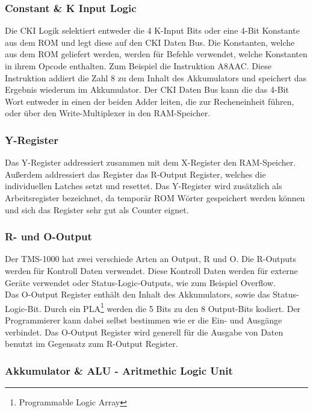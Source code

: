 \subsubsection{Constant \& K Input Logic}

Die CKI Logik selektiert entweder die 4 K-Input Bits oder eine 4-Bit Konstante aus dem ROM und legt diese auf den CKI Daten Bus. Die Konstanten, welche aus dem ROM geliefert werden, werden f{\"u}r Befehle verwendet, welche Konstanten in ihrem Opcode enthalten. Zum Beispiel die Instruktion A8AAC. Diese Instruktion addiert die Zahl 8 zu dem Inhalt des Akkumulators und speichert das Ergebnis wiederum im Akkumulator. Der CKI Daten Bus kann die das 4-Bit Wort entweder in einen der beiden Adder leiten, die zur Recheneinheit f{\"u}hren, oder {\"u}ber den Write-Multiplexer in den RAM-Speicher.

\subsubsection{Y-Register}

Das Y-Register addressiert zusammen mit dem X-Register den RAM-Speicher. Au{\ss}erdem addressiert das Register das R-Output Register, welches die individuellen Latches setzt und resettet. Das Y-Register wird zus{\"a}tzlich als Arbeitsregister bezeichnet, da tempor{\"a}r ROM W{\"o}rter gespeichert werden k{\"o}nnen und sich das Register sehr gut als Counter eignet.

\subsubsection{R- und O-Output}

Der TMS-1000 hat zwei verschiede Arten an Output, R und O. Die R-Outputs werden f{\"u}r Kontroll Daten verwendet. Diese Kontroll Daten werden f{\"u}r externe Ger{\"a}te verwendet oder Status-Logic-Outputs, wie zum Beispiel Overflow. \\
Das O-Output Register enth{\"a}lt den Inhalt des Akkumulators, sowie das Status-Logic-Bit. Durch ein PLA\footnote{Programmable Logic Array} werden die 5 Bits zu den 8 Output-Bits kodiert. Der Programmierer kann dabei selbst bestimmen wie er die Ein- und Ausg{\"a}nge verbindet. Das O-Output Register wird generell f{\"u}r die Ausgabe von Daten benutzt im Gegensatz zum R-Output Register.

\subsubsection{Akkumulator \& ALU - Aritmethic Logic Unit}


